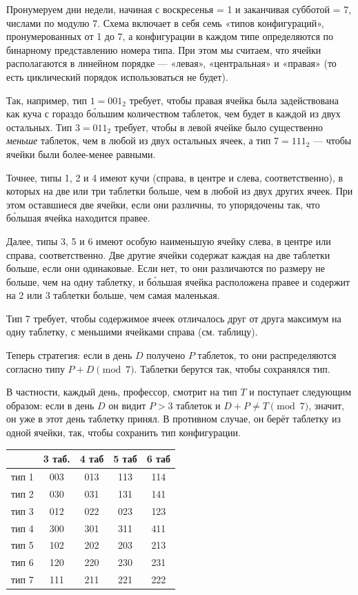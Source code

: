 Пронумеруем дни недели, начиная с воскресенья = 1 и заканчивая субботой = 7, числами по модулю 7.
Схема включает в себя семь «типов конфигураций», пронумерованных от 1 до 7, а конфигурации в каждом типе определяются по бинарному представлению номера типа.
При этом мы считаем, что ячейки располагаются в линейном порядке --- «левая», «центральная» и «правая» (то есть циклический порядок использоваться не будет).

Так, например, тип $1=001_2$ требует, чтобы правая ячейка была задействована как куча с гораздо б\'{о}льшим количеством таблеток, чем будет в каждой из двух остальных.
Тип $3 = 011_2$ требует, чтобы в левой ячейке было существенно \emph{меньше} таблеток, чем в любой из двух остальных ячеек,
а тип 7$ = 111_2$ --- чтобы ячейки были более-менее равными.

Точнее, типы 1, 2 и 4 имеют кучи (справа, в центре и слева, соответственно), в которых на две или три таблетки больше, чем в любой из двух других ячеек.
При этом оставшиеся две ячейки, если они различны, то упорядочены так, что б\'{о}льшая ячейка находится правее.

Далее, типы 3, 5 и 6 имеют особую наименьшую ячейку слева, в центре или справа, соответственно.
Две другие ячейки содержат каждая на две таблетки больше, если они одинаковые.
Если нет, то они различаются по размеру не больше, чем на одну таблетку, и б\'{о}льшая ячейка расположена правее и содержит на 2 или 3 таблетки больше, чем самая маленькая.

Тип 7 требует, чтобы содержимое ячеек отличалось друг от друга максимум на одну таблетку, с меньшими ячейками справа (см. таблицу).

Теперь стратегия: если в день $D$ получено $P$ таблеток, то они распределяются согласно типу $P+D \pmod 7$.
Таблетки берутся так, чтобы сохранялся тип.

В частности, каждый день, профессор, смотрит на тип $T$ и поступает следующим образом:
если в день $D$ он видит $P>3$ таблеток и $D+P\ne T\pmod 7$, значит, он уже в этот день таблетку принял.
В противном случае, он берёт таблетку из одной ячейки, так, чтобы сохранить тип конфигурации.

\begin{center}
  \begin{tabular}{ l | c c c c }
     & 3 таб. & 4 таб & 5 таб & 6 таб \\ \hline
    тип 1 & 003 & 013 & 113 & 114 \\ 
    тип 2 & 030 & 031 & 131 & 141 \\ 
    тип 3 & 012 & 022 & 023 & 123\\ 
    тип 4 & 300 & 301 & 311 & 411\\ 
    тип 5 & 102 & 202 & 203 & 213\\ 
    тип 6 & 120 & 220 & 230 & 231\\ 
    тип 7 & 111 & 211 & 221 & 222
  \end{tabular}
\end{center}

